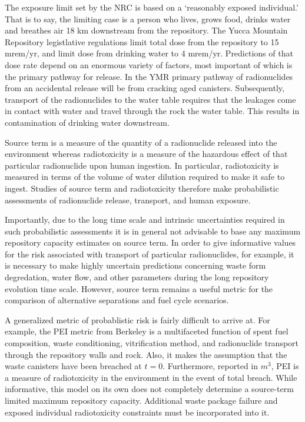 The exposure limit set by the NRC is based on a `reasonably exposed 
individual.' That is to say, the limiting case is a person who lives, 
grows food, drinks water and breathes air 18 km downstream from the 
repository. The Yucca Mountain Repository legistlative regulations 
limit total dose from the repository to 15 mrem/yr, and limit dose 
from drinking water to 4 mrem/yr.  Predictions of that dose rate 
depend on an enormous variety of factors, most important of which is 
the primary pathway for release. In the \gls{YMR} primary pathway of 
radionuclides from an accidental release will be from cracking aged 
canisters. Subsequently, transport of the radionuclides to the water 
table requires that the leakages come in contact with water and travel 
through the rock the water table. This results in contamination of 
drinking water downstream.  

Source term is a measure of the quantity of a radionuclide released 
into the environment whereas radiotoxicity is a measure of the 
hazardous effect of that particular radionuclide upon human ingestion.  
In particular, radiotoxicity is measured in terms of the volume of 
water dilution required to make it safe to ingest. Studies of source 
term and radiotoxicity therefore make probabilistic assessments of 
radionuclide release, transport, and human exposure.  

Importantly, due to the long time scale and intrinsic uncertainties 
required in such probabilistic assessments it is in general not 
advisable to base any maximum repository capacity estimates on source 
term.
In order to give informative values for the risk associated with 
transport of particular radionuclides, for example, it is necessary to 
make highly uncertain  predictions concerning waste form degredation, 
water flow, and other parameters during the long repository evolution 
time scale.  However, source term remains a useful metric for the comparison 
of alternative separations and fuel cycle scenarios.

A generalized metric of probablistic risk is fairly difficult to 
arrive at. For example, the \gls{PEI} metric from Berkeley 
\cite{bouvier_comparison_2007} is a multifaceted 
function of spent fuel composition, waste conditioning, vitrification 
method, and radionuclide transport through the repository walls and 
rock.  Also, it makes the assumption that the waste canisters have 
been breached at $t=0$. Furthermore, reported in $m^3$, PEI is a 
measure of radiotoxicity in the environment in the event of total 
breach. While informative, this model on its own does not completely 
determine a source-term limited maximum repository capacity.  
Additional waste package failure and exposed individual radiotoxicity 
constraints must be incorporated into it.

